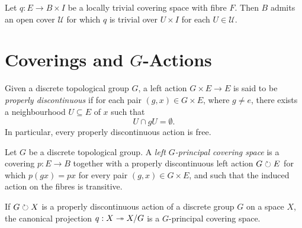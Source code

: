 \begin{proposition}
Let \(q: E \to B \times I\) be a locally trivial covering space with
fibre \(F\). Then \(B\) admits an open cover \(\mathcal{U}\) for which \(q\) is
trivial over \(U \times I\) for each \(U \in \mathcal{U}\).
\end{proposition}



\section{Coverings and \texorpdfstring{\(G\)}{G}-Actions}

\begin{definition}
\label{def:properly-discontinuous-action}
Given a discrete topological group \(G\), a left action \(G \times E \to E\) is
said to be \emph{properly discontinuous} if for each pair
\((g, x) \in G \times E\), where \(g \neq e\), there exists a neighbourhood
\(U \subseteq E\) of \(x\) such that
\[
U \cap g U = \emptyset.
\]
In particular, every properly discontinuous action is free.
\end{definition}

\begin{definition}
\label{def:G-principal-covering}
Let \(G\) be a discrete topological group. A \emph{left \(G\)-principal covering
  space} is a covering \(p: E \to B\) together with a properly discontinuous
left action \(G \circlearrowright E\) for which \(p(g x) = p x\) for every pair
\((g, x) \in G \times E\), and such that the induced action on the fibres is
transitive.
\end{definition}

\begin{proposition}
\label{prop:properly-discontinuous-induces-covering}
If \(G \circlearrowright X\) is a properly discontinuous action of a discrete group \(G\)
on a space \(X\), the canonical projection \(q: X \twoheadrightarrow X/G\) is a
\(G\)-principal covering space.
\end{proposition}

